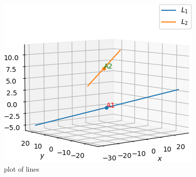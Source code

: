 \begin{figure}[!ht]
\centering 
\includegraphics[width=\columnwidth]{solutions/sep/2/22/Figures/plot.png}
\caption{plot of lines}
\label{sep/2/22/skew_lines}
\end{figure}
